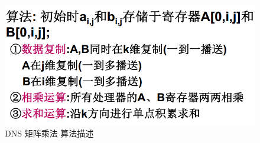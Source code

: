 \documentclass[UTF8,a4paper]{ctexart}
\begin{document}
\begin{figure}[H]
  \centering
  \includegraphics[scale = 0.3]{assets/ParallelComputing_04086.png}
  \caption{DNS 矩阵乘法 算法描述}
\end{figure}
\end{document}
